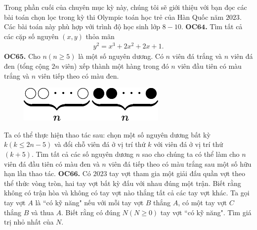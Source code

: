 \begin{multicols}{2}
	\vskip 0.1cm
	Trong phần cuối của chuyên mục kỳ này, chúng tôi sẽ giới thiệu với bạn đọc các bài toán chọn lọc trong kỳ thi Olympic toán học trẻ của Hàn Quốc năm $2023$. Các bài toán này phù hợp với trình độ học sinh lớp $8-10$.
	\vskip 0.1cm
	{\bf\color{cackithi} OC$\pmb{64}$.} Tìm tất cả các cặp số nguyên $(x, y)$ thỏa mãn
	\begin{align*}
		y^2 = x^3 + 2x^2 + 2x + 1.
	\end{align*}
	{\bf\color{cackithi} OC$\pmb{65}$.} Cho $n (n\geq 5) $ là một số nguyên dương. Có $n$ viên đá trắng và $n$ viên đá đen (tổng cộng $2n$ viên) xếp thành một hàng trong đó $n$ viên đầu tiên có màu trắng và $n$ viên tiếp theo có màu đen.
	\begin{figure}[H]
		\vspace*{-5pt}
		\centering
		\captionsetup{labelformat= empty, justification=centering}
		\includegraphics[width= 0.7\linewidth]{OC65}
		\vspace*{-10pt}
	\end{figure}
	Ta có thể thực hiện thao tác sau: chọn một số nguyên dương bất kỳ $k (k \leq 2n - 5)$ và  đổi chỗ viên đá ở vị trí thứ $k$ với viên đá ở vị trí thứ  $(k+5).$ 
	\vskip 0.1cm
	Tìm tất cả các số nguyên dương $n$ sao cho chúng ta có thể làm cho $n$ viên đá đầu tiên có màu đen và   $n$ viên đá tiếp theo có màu trắng sau một số hữu hạn lần thao tác.
	\vskip 0.1cm
	{\bf\color{cackithi} OC$\pmb{66}$.} Có $2023$ tay vợt  tham gia  một giải đấu quần vợt theo thể thức vòng tròn, hai tay vợt bất kỳ đấu với nhau đúng một trận. Biết rằng không có trận hòa và không có tay vợt nào thắng tất cả các tay vợt khác. Ta  gọi tay vợt $A$ là ``có kỹ năng" nếu với mỗi tay vợt $B$ thắng $A$, có một tay vợt $C$ thắng $B$ và thua $A$.
	\vskip 0.1cm
	Biết rằng có đúng $N (N\geq 0)$ tay vợt ``có kỹ năng". Tìm giá trị nhỏ nhất của $N$.	
\end{multicols}
